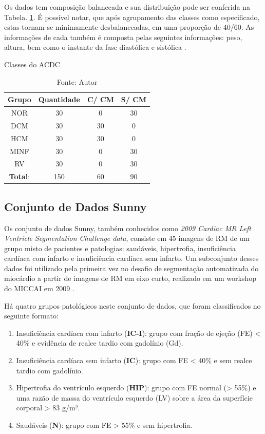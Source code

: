 Os dados tem composição balanceada e sua distribuição pode ser conferida na Tabela. \ref{tab:count_dataset}. É possível notar, que após agrupamento das classes como especificado, estas tornam-se minimamente desbalanceadas, em uma proporção de 40/60. As informações de cada também é composta pelas seguintes informações: peso, altura, bem como o instante da fase diastólica e sistólica \cite{bernardDeepLearningTechniques2018a}.

\begin{table}[hbtp]
    \centering
    \caption{Classes do ACDC}
    \renewcommand{\arraystretch}{1} %
    \begin{tabular}{|c|c|c|c|}
    \hline 
          \textbf{Grupo} & \textbf{Quantidade} & \textbf{C/ CM} & \textbf{S/ CM}  \\ 
    \hline 
        NOR & 30 & 0 & 30 \\ 
        DCM & 30 & 30 & 0\\ 
        HCM & 30 & 30 & 0\\ 
        MINF & 30 & 0 & 30 \\ 
        RV & 30 & 0 & 30 \\
    \hline 
        \textbf{Total}: & 150  & 60 & 90\\ 
    \hline 
    \end{tabular} 
    \caption*{Fonte: Autor}
    \label{tab:count_dataset}
\end{table}


\subsection{Conjunto de Dados Sunny} 
\label{subsec:cap4_sunny}

Os conjunto de dados  Sunny, também conhecidos como \textit{2009 Cardiac MR Left Ventricle Segmentation Challenge data}, consiste em 45 imagens de RM de um grupo misto de pacientes e patologias: saudáveis, hipertrofia, insuficiência cardíaca com infarto e insuficiência cardíaca sem infarto. Um subconjunto desses dados foi utilizado pela primeira vez no desafio de segmentação automatizada do miocárdio a partir de imagens de RM em eixo curto, realizado em um workshop do MICCAI em 2009 \cite{radauEvaluationFrameworkAlgorithms2009}. 

Há quatro grupos patológicos neste conjunto de dados, que foram classificados no seguinte formato:

\begin{enumerate}
    \item Insuficiência cardíaca com infarto (\textbf{IC-I}): grupo com fração de ejeção (FE) < 40\% e evidência de realce tardio com gadolínio (Gd).
    \item Insuficiência cardíaca sem infarto (\textbf{IC}): grupo com FE < 40\% e sem realce tardio com gadolínio.
    \item Hipertrofia do ventrículo esquerdo (\textbf{HIP}): grupo com FE normal (> 55\%) e uma razão de massa do ventrículo esquerdo (LV) sobre a área da superfície corporal > 83 g/m².
    \item Saudáveis (\textbf{N}): grupo com FE > 55\% e sem hipertrofia.
\end{enumerate}

